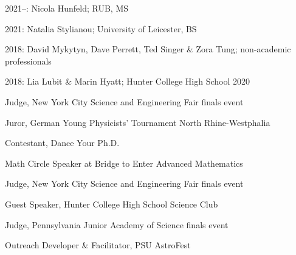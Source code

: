 \documentclass[11pt,letterpaper]{article}
\begin{document}
\begin{list}{}{\malzlist}
	\item 2021--: Nicola Hunfeld; RUB, MS 
	\item 2021: Natalia Stylianou; University of Leicester, BS 
	\item 2018: David Mykytyn, Dave Perrett, Ted Singer \& Zora Tung; non-academic professionals
	\item 2018: Lia Lubit \& Marin Hyatt; Hunter College High School 2020
\end{list}

\begin{list}{}{\malzlist}
\item Judge, New York City Science and Engineering Fair finals event %
\item Juror, German Young Physicists' Tournament North Rhine-Westphalia %
\item Contestant, Dance Your Ph.D.  %
  \begin{list}{}{\malzlist}
  \item {}
    \end{list}
\item Math Circle Speaker at Bridge to Enter Advanced Mathematics %
  \begin{list}{}{\malzlist}
  \item {}%
  \end{list}
\item Judge, New York City Science and Engineering Fair finals event %
\item Guest Speaker, Hunter College High School Science Club %
\item Judge, Pennsylvania Junior Academy of Science finals event %
\item Outreach Developer \& Facilitator, PSU AstroFest 
  \begin{list}{}{\malzlist}
    \item {}%
  \end{list}
\end{list}
\end{document}
